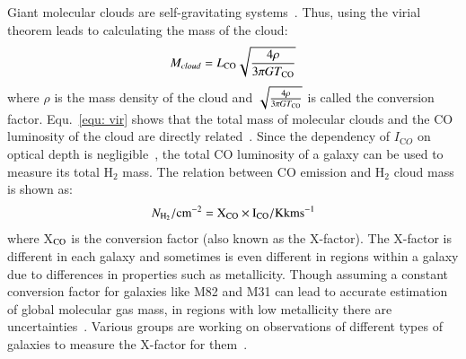 Giant molecular clouds are self-gravitating systems~\citep[e.g.][]{Efstathiou83,Blitz99}.
Thus, using the virial theorem leads to calculating the mass of the cloud: 
 \begin{equation}
 \label{equ: vir}
 M_{cloud} = L_{\rm CO} \sqrt{\frac{4\rho}{3\pi G T_{\rm CO}}}
 \end{equation}
 where $\rho$ is the mass density of the cloud and $\sqrt{\frac{4\rho}{3\pi G T_{\rm CO}}}$ is called the conversion factor.
 Equ.~\ref{equ: vir} shows that the total mass of molecular clouds and the CO luminosity of the cloud are directly related~\citep{Young91}. 
 Since the dependency of $I_{\mathrm CO}$ on optical depth is negligible~\citep{Krumholz09}, the total CO luminosity of a galaxy can be used to measure its total H$_2$ mass.
 The relation between CO emission and H$_2$ cloud mass is shown as:
\begin{equation}
N_{\rm H_2}/\rm cm^{-2} = X_{\rm CO} \times I_{\rm CO}/{\rm K km s}^{-1}
\end{equation}
where X$_{\rm CO}$ is the conversion factor (also known as the X-factor).
The X-factor is different in each galaxy and sometimes is even different in regions within a galaxy due to differences in properties such as metallicity. 
Though assuming a constant conversion factor for galaxies like M82 and M31 can lead to accurate estimation of global molecular gas mass, in regions with low metallicity there are uncertainties~\citep{Bolato13}. 
Various groups are working on observations of different types of galaxies to measure the X-factor for them~\citep{Wilson95, Bosselli02, Bolato13}.

